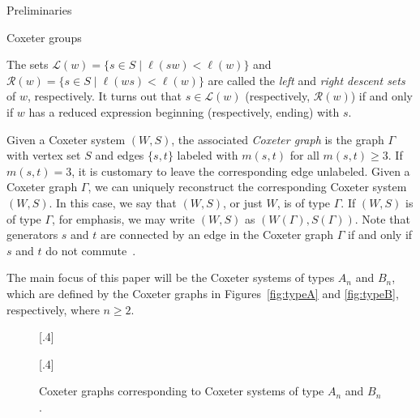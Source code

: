\documentclass[11pt]{amsart}
\theoremstyle{definition}
\numberwithin{equation}{section}
\newcommand{\x}{\mathsf{x}}
\renewcommand{\L}{\mathcal{L}}
\newcommand{\R}{\mathcal{R}}
\renewcommand{\(}{\left(}
\renewcommand{\)}{\right)}
\newcommand{\w}{\mathsf{w}}
\begin{document}
\begin{section}{Preliminaries}
\begin{subsection}{Coxeter groups}

The sets $\L(w)=\{s \in S\mid \ell(sw) < \ell(w)\}$ and $\R(w)=\{s \in S\mid \ell(ws) < \ell(w)\}$ are called the \emph{left} and \emph{right descent sets} of $w$, respectively.  It turns out that $s \in \L(w)$ (respectively, $\R(w)$) if and only if $w$ has a reduced expression beginning (respectively, ending) with $s$.

Given a Coxeter system $(W,S)$, the associated \emph{Coxeter graph} is the graph $\Gamma$ with vertex set $S$ and edges $\{s,t\}$ labeled with $m(s,t)$ for all $m(s,t)\geq 3$.  If $m(s,t)=3$, it is customary to leave the corresponding edge unlabeled.  Given a Coxeter graph $\Gamma$, we can uniquely reconstruct the corresponding Coxeter system $(W,S)$.  In this case, we say that $(W,S)$, or just $W$, is of type $\Gamma$. If $(W,S)$ is of type $\Gamma$, for emphasis, we may write $(W,S)$ as $(W(\Gamma),S(\Gamma))$.  Note that generators $s$ and $t$ are connected by an edge in the Coxeter graph $\Gamma$ if and only if $s$ and $t$ do not commute~\cite{Humphreys1990}.

The main focus of this paper will be the Coxeter systems of types $A_n$ and $B_n$, which are defined by the Coxeter graphs in Figures~\ref{fig:typeA} and \ref{fig:typeB}, respectively, where $n\geq 2$.

\begin{figure}[!ht]
[.4\textwidth]{
}
[.4\textwidth]{
}
\caption{Coxeter graphs corresponding to Coxeter systems of type $A_{n}$ and $B_n$.}\label{fig:CoxeterGraphs}
\end{figure}


\end{subsection}
\end{section}
\end{document}
